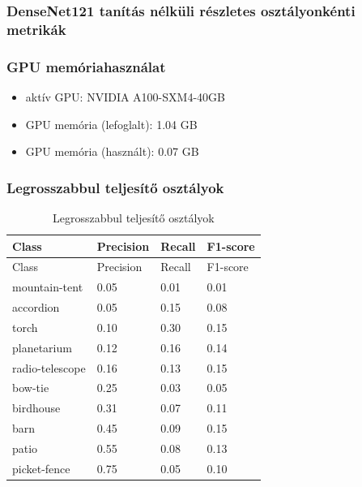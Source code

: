 \subsubsection{DenseNet121 tanítás nélküli részletes osztályonkénti metrikák}
  

\subsubsection{GPU memóriahasználat}
\begin{itemize}
  \item aktív GPU: NVIDIA A100-SXM4-40GB
  \item GPU memória (lefoglalt): 1.04 GB
  \item GPU memória (használt):  0.07 GB
\end{itemize}

\subsubsection{Legrosszabbul teljesítő osztályok}
\begin{center}
  \begin{longtable}{llll}
  \caption{Legrosszabbul teljesítő osztályok}\label{tab:phase01_DenseNet121_legrosszabb_osztlyok}\\
  \toprule
  Class & Precision & Recall & F1-score \\
  \midrule
  \endfirsthead
  \toprule
  Class & Precision & Recall & F1-score \\
  \midrule
  \endhead
  mountain-tent & 0.05 & 0.01 & 0.01 \\
  accordion & 0.05 & 0.15 & 0.08 \\
  torch & 0.10 & 0.30 & 0.15 \\
  planetarium & 0.12 & 0.16 & 0.14 \\
  radio-telescope & 0.16 & 0.13 & 0.15 \\
  bow-tie & 0.25 & 0.03 & 0.05 \\
  birdhouse & 0.31 & 0.07 & 0.11 \\
  barn & 0.45 & 0.09 & 0.15 \\
  patio & 0.55 & 0.08 & 0.13 \\
  picket-fence & 0.75 & 0.05 & 0.10 \\
  \bottomrule
  \end{longtable}
  \end{center}